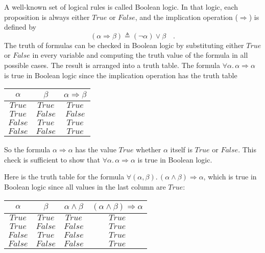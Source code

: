 A well-known set of logical rules is called Boolean
logic. In that logic, each proposition is always either $True$ or
$False$, and the implication operation ($\Rightarrow$) is defined
by 
\begin{equation}
\left(\alpha\Rightarrow\beta\right)\triangleq(\neg\alpha)\vee\beta\quad.\label{eq:ch-definition-of-implication-in-Boolean-logic}
\end{equation}
The truth of formulas can be checked in Boolean logic by substituting
either $True$ or $False$ in every variable and computing the truth
value of the formula in all possible cases. The result is arranged
into a truth table. The formula $\forall\alpha.\,\alpha\Rightarrow\alpha$
is true in Boolean logic since the implication operation has the truth
table
\begin{center}
\begin{tabular}{|c|c|c|}
\hline 
$\alpha$ & $\beta$ & \textbf{$\alpha\Rightarrow\beta$}\tabularnewline
\hline 
\hline 
{\footnotesize{}$True$} & {\footnotesize{}$True$} & {\footnotesize{}$True$}\tabularnewline
\hline 
{\footnotesize{}$True$} & {\footnotesize{}$False$} & {\footnotesize{}$False$}\tabularnewline
\hline 
{\footnotesize{}$False$} & {\footnotesize{}$True$} & {\footnotesize{}$True$}\tabularnewline
\hline 
{\footnotesize{}$False$} & {\footnotesize{}$False$} & {\footnotesize{}$True$}\tabularnewline
\hline 
\end{tabular}
\par\end{center}

So the formula $\alpha\Rightarrow\alpha$ has the value $True$ whether
$\alpha$ itself is $True$ or $False$. This check is sufficient
to show that $\forall\alpha.\,\alpha\Rightarrow\alpha$ is true in
Boolean logic.

Here is the truth table for the formula $\forall(\alpha,\beta).\,(\alpha\wedge\beta)\Rightarrow\alpha$,
which is true in Boolean logic since all values in the last column
are $True$:
\begin{center}
\begin{tabular}{|c|c|c|c|}
\hline 
$\alpha$ & $\beta$ & \textbf{$\alpha\wedge\beta$} & $(\alpha\wedge\beta)\Rightarrow\alpha$\tabularnewline
\hline 
\hline 
{\footnotesize{}$True$} & {\footnotesize{}$True$} & {\footnotesize{}$True$} & {\footnotesize{}$True$}\tabularnewline
\hline 
{\footnotesize{}$True$} & {\footnotesize{}$False$} & {\footnotesize{}$False$} & {\footnotesize{}$True$}\tabularnewline
\hline 
{\footnotesize{}$False$} & {\footnotesize{}$True$} & {\footnotesize{}$False$} & {\footnotesize{}$True$}\tabularnewline
\hline 
{\footnotesize{}$False$} & {\footnotesize{}$False$} & {\footnotesize{}$False$} & {\footnotesize{}$True$}\tabularnewline
\hline 
\end{tabular}
\par\end{center}

